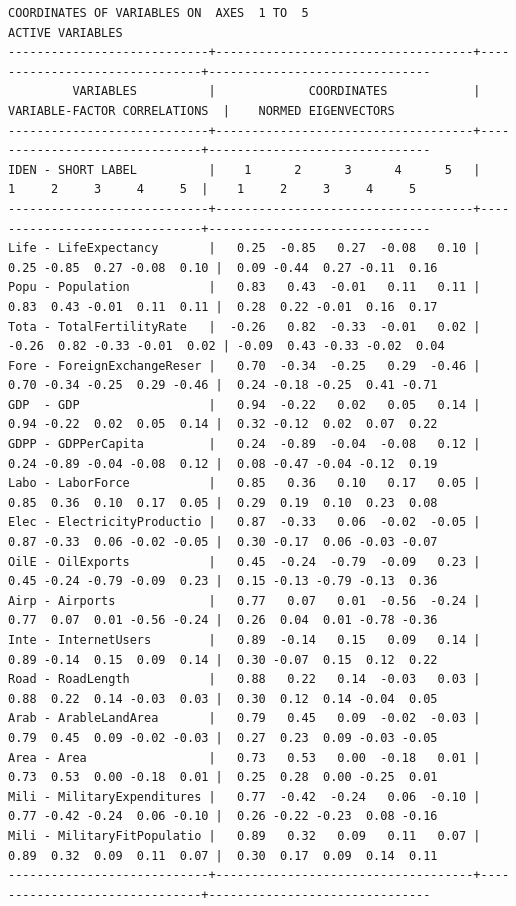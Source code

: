 \documentclass[a4paper,10pt,twocolumn]{article}
\begin{document}
\begin{landscape}
\begin{verbatim}
COORDINATES OF VARIABLES ON  AXES  1 TO  5
ACTIVE VARIABLES
----------------------------+------------------------------------+-------------------------------+-------------------------------
         VARIABLES          |             COORDINATES            | VARIABLE-FACTOR CORRELATIONS  |    NORMED EIGENVECTORS
----------------------------+------------------------------------+-------------------------------+-------------------------------
IDEN - SHORT LABEL          |    1      2      3      4      5   |    1     2     3     4     5  |    1     2     3     4     5
----------------------------+------------------------------------+-------------------------------+-------------------------------
Life - LifeExpectancy       |   0.25  -0.85   0.27  -0.08   0.10 |  0.25 -0.85  0.27 -0.08  0.10 |  0.09 -0.44  0.27 -0.11  0.16
Popu - Population           |   0.83   0.43  -0.01   0.11   0.11 |  0.83  0.43 -0.01  0.11  0.11 |  0.28  0.22 -0.01  0.16  0.17
Tota - TotalFertilityRate   |  -0.26   0.82  -0.33  -0.01   0.02 | -0.26  0.82 -0.33 -0.01  0.02 | -0.09  0.43 -0.33 -0.02  0.04
Fore - ForeignExchangeReser |   0.70  -0.34  -0.25   0.29  -0.46 |  0.70 -0.34 -0.25  0.29 -0.46 |  0.24 -0.18 -0.25  0.41 -0.71
GDP  - GDP                  |   0.94  -0.22   0.02   0.05   0.14 |  0.94 -0.22  0.02  0.05  0.14 |  0.32 -0.12  0.02  0.07  0.22
GDPP - GDPPerCapita         |   0.24  -0.89  -0.04  -0.08   0.12 |  0.24 -0.89 -0.04 -0.08  0.12 |  0.08 -0.47 -0.04 -0.12  0.19
Labo - LaborForce           |   0.85   0.36   0.10   0.17   0.05 |  0.85  0.36  0.10  0.17  0.05 |  0.29  0.19  0.10  0.23  0.08
Elec - ElectricityProductio |   0.87  -0.33   0.06  -0.02  -0.05 |  0.87 -0.33  0.06 -0.02 -0.05 |  0.30 -0.17  0.06 -0.03 -0.07
OilE - OilExports           |   0.45  -0.24  -0.79  -0.09   0.23 |  0.45 -0.24 -0.79 -0.09  0.23 |  0.15 -0.13 -0.79 -0.13  0.36
Airp - Airports             |   0.77   0.07   0.01  -0.56  -0.24 |  0.77  0.07  0.01 -0.56 -0.24 |  0.26  0.04  0.01 -0.78 -0.36
Inte - InternetUsers        |   0.89  -0.14   0.15   0.09   0.14 |  0.89 -0.14  0.15  0.09  0.14 |  0.30 -0.07  0.15  0.12  0.22
Road - RoadLength           |   0.88   0.22   0.14  -0.03   0.03 |  0.88  0.22  0.14 -0.03  0.03 |  0.30  0.12  0.14 -0.04  0.05
Arab - ArableLandArea       |   0.79   0.45   0.09  -0.02  -0.03 |  0.79  0.45  0.09 -0.02 -0.03 |  0.27  0.23  0.09 -0.03 -0.05
Area - Area                 |   0.73   0.53   0.00  -0.18   0.01 |  0.73  0.53  0.00 -0.18  0.01 |  0.25  0.28  0.00 -0.25  0.01
Mili - MilitaryExpenditures |   0.77  -0.42  -0.24   0.06  -0.10 |  0.77 -0.42 -0.24  0.06 -0.10 |  0.26 -0.22 -0.23  0.08 -0.16
Mili - MilitaryFitPopulatio |   0.89   0.32   0.09   0.11   0.07 |  0.89  0.32  0.09  0.11  0.07 |  0.30  0.17  0.09  0.14  0.11
----------------------------+------------------------------------+-------------------------------+-------------------------------


\end{verbatim}
\end{landscape}
\end{document}
